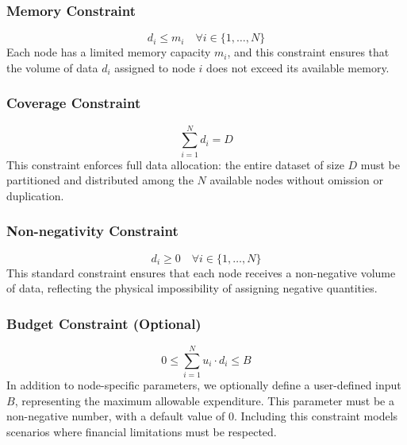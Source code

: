\documentclass[]{interact}
\theoremstyle{plain}
\theoremstyle{definition}
\theoremstyle{remark}
\begin{document}
\subsubsection{Memory Constraint}
\begin{equation}
    d_i \leq m_i \quad \forall i \in \{1, \ldots, N\}
\end{equation}
Each node has a limited memory capacity $m_i$, and this constraint ensures that the volume of data $d_i$ assigned to node $i$ does not exceed its available memory.

\subsubsection{Coverage Constraint}
\begin{equation}
    \sum_{i=1}^{N} d_i = D
\end{equation}
This constraint enforces full data allocation: the entire dataset of size $D$ must be partitioned and distributed among the $N$ available nodes without omission or duplication.

\subsubsection{Non-negativity Constraint}
\begin{equation}
    d_i \geq 0 \quad \forall i \in \{1, \ldots, N\}
\end{equation}
This standard constraint ensures that each node receives a non-negative volume of data, reflecting the physical impossibility of assigning negative quantities.


\subsubsection{Budget Constraint (Optional)}
\begin{equation}
    0 \leq \sum_{i=1}^{N} u_i \cdot d_i \leq B
\end{equation}
In addition to node-specific parameters, we optionally define a user-defined input $B$, representing the maximum allowable expenditure. This parameter must be a non-negative number, with a default value of $0$. Including this constraint models scenarios where financial limitations must be respected.
\end{document}

